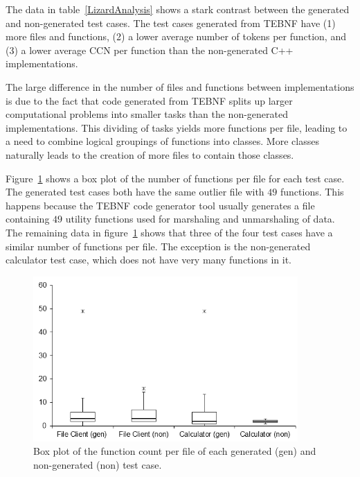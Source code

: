 \indent
The data in table~\ref{LizardAnalysis} shows a stark contrast between the generated and non-generated test cases.  The test cases generated from TEBNF have (1) more files and functions, (2) a lower average number of tokens per function, and (3) a lower average CCN per function than the non-generated C++ implementations.

\indent
The large difference in the number of files and functions between implementations is due to the fact that code generated from TEBNF splits up larger computational problems into smaller tasks than the non-generated implementations.  This dividing of tasks yields more functions per file, leading to a need to combine logical groupings of functions into classes.  More classes naturally leads to the creation of more files to contain those classes.

\indent
Figure~\ref{fig:Lizard_FunctionCount} shows a box plot of the number of functions per file for each test case.  The generated test cases both have the same outlier file with $49$ functions.  This happens because the TEBNF code generator tool usually generates a file containing $49$ utility functions used for marshaling and unmarshaling of data.  The remaining data in figure~\ref{fig:Lizard_FunctionCount} shows that three of the four test cases have a similar number of functions per file.  The exception is the non-generated calculator test case, which does not have very many functions in it.

\begin{figure}[h!]
\centering
\includegraphics[width=0.9\textwidth]{figures/Lizard_FunctionCount.png}
\caption[Box plot of the function count per file of each generated and non-generated test case.]{Box plot of the function count per file of each generated (gen) and non-generated (non) test case.}
\label{fig:Lizard_FunctionCount}
\end{figure}

